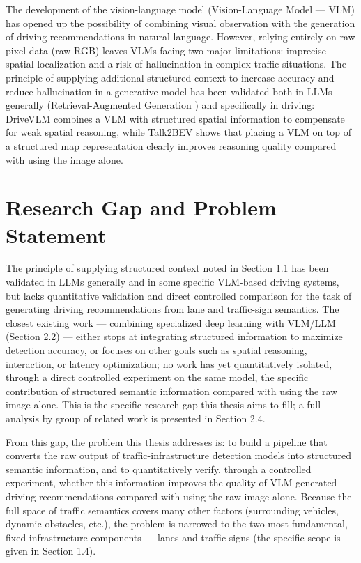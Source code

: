 \documentclass[12pt,a4paper]{report}
\begin{document}
The development of the vision-language model (Vision-Language Model --- VLM) has opened up the possibility of combining visual observation with the generation of driving recommendations in natural language. However, relying entirely on raw pixel data (raw RGB) leaves VLMs facing two major limitations: imprecise spatial localization and a risk of hallucination in complex traffic situations. The principle of supplying additional structured context to increase accuracy and reduce hallucination in a generative model has been validated both in LLMs generally (Retrieval-Augmented Generation \cite{lewis2020rag}) and specifically in driving: DriveVLM \cite{tian2024drivevlm} combines a VLM with structured spatial information to compensate for weak spatial reasoning, while Talk2BEV \cite{choudhary2024talk2bev} shows that placing a VLM on top of a structured map representation clearly improves reasoning quality compared with using the image alone.

\section{Research Gap and Problem Statement}

The principle of supplying structured context noted in Section 1.1 has been validated in LLMs generally and in some specific VLM-based driving systems, but lacks quantitative validation and direct controlled comparison for the task of generating driving recommendations from lane and traffic-sign semantics. The closest existing work --- combining specialized deep learning with VLM/LLM (Section 2.2) --- either stops at integrating structured information to maximize detection accuracy, or focuses on other goals such as spatial reasoning, interaction, or latency optimization; no work has yet quantitatively isolated, through a direct controlled experiment on the same model, the specific contribution of structured semantic information compared with using the raw image alone. This is the specific research gap this thesis aims to fill; a full analysis by group of related work is presented in Section 2.4.

From this gap, the problem this thesis addresses is: to build a pipeline that converts the raw output of traffic-infrastructure detection models into structured semantic information, and to quantitatively verify, through a controlled experiment, whether this information improves the quality of VLM-generated driving recommendations compared with using the raw image alone. Because the full space of traffic semantics covers many other factors (surrounding vehicles, dynamic obstacles, etc.), the problem is narrowed to the two most fundamental, fixed infrastructure components --- lanes and traffic signs (the specific scope is given in Section 1.4).
\end{document}

